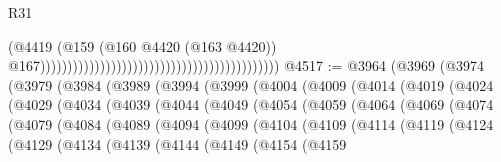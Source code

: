 \begin{lexlean}{R31}
\begin{coremodule}
                                                                                        (@4419
                                                                                          (@159
                                                                                            (@160
                                                                                              @4420
                                                                                              (@163
                                                                                                @4420))
                                                                                            @167))))))))))))))))))))))))))))))))))))))))))))
@4517 := @3964
    (@3969
      (@3974
        (@3979
          (@3984
            (@3989
              (@3994
                (@3999
                  (@4004
                    (@4009
                      (@4014
                        (@4019
                          (@4024
                            (@4029
                              (@4034
                                (@4039
                                  (@4044
                                    (@4049
                                      (@4054
                                        (@4059
                                          (@4064
                                            (@4069
                                              (@4074
                                                (@4079
                                                  (@4084
                                                    (@4089
                                                      (@4094
                                                        (@4099
                                                          (@4104
                                                            (@4109
                                                              (@4114
                                                                (@4119
                                                                  (@4124
                                                                    (@4129
                                                                      (@4134
                                                                        (@4139
                                                                          (@4144
                                                                            (@4149
                                                                              (@4154
                                                                                (@4159

\end{coremodule}
\end{lexlean}
